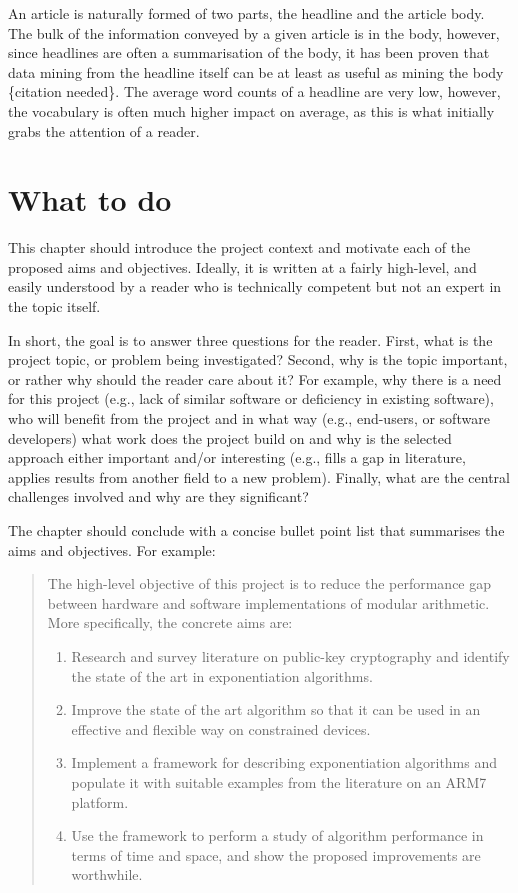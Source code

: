 \documentclass[ oneside,%
                    author={Joshua Felmeden},
                    degree={MEng},
                     title={Semantic Analysis of Financial Headlines Based on Realised Stock Returns},
                  subtitle={}]{dissertation}
\begin{document}
An article is naturally formed of two parts, the headline and the article body. The bulk of the information conveyed by a given article is in the body, however, since headlines are often a summarisation of the body, it has been proven that data mining from the headline itself can be at least as useful as mining the body \{citation needed\}. The average word counts of a headline are very low, however, the vocabulary is often much higher impact on average, as this is what initially grabs the attention of a reader.

\section{What to do}

\noindent
This chapter should introduce the project context and motivate each of the proposed aims and objectives.  Ideally, it is written at a fairly high-level, and easily understood by a reader who is technically competent but not an expert in the topic itself.

In short, the goal is to answer three questions for the reader.  First, what is the project topic, or problem being investigated?  Second, why is the topic important, or rather why should the reader care about it?  For example, why there is a need for this project (e.g., lack of similar software or deficiency in existing software), who will benefit from the project and in what way (e.g., end-users, or software developers) what work does the project build on and why is the selected approach either important and/or interesting (e.g., fills a gap in literature, applies results from another field to a new problem).  Finally, what are the central challenges involved and why are they significant? 
 
The chapter should conclude with a concise bullet point list that summarises the aims and objectives.  For example:

\begin{quote}
\noindent
The high-level objective of this project is to reduce the performance 
gap between hardware and software implementations of modular arithmetic.  
More specifically, the concrete aims are:

\begin{enumerate}
\item Research and survey literature on public-key cryptography and
      identify the state of the art in exponentiation algorithms.
\item Improve the state of the art algorithm so that it can be used
      in an effective and flexible way on constrained devices.
\item Implement a framework for describing exponentiation algorithms
      and populate it with suitable examples from the literature on 
      an ARM7 platform.
\item Use the framework to perform a study of algorithm performance
      in terms of time and space, and show the proposed improvements
      are worthwhile.
\end{enumerate}
\end{quote}
\end{document}
